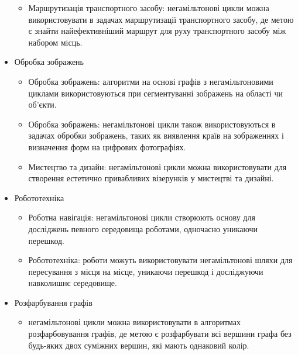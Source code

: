 \documentclass[14pt]{article}
\begin{document}
\begin{spacing}{1.175}
\begin{itemize}
\begin{itemize}
            \item Маршрутизація транспортного засобу: негамільтонові цикли можна використовувати в задачах маршрутизації транспортного засобу, де метою є знайти найефективніший маршрут для руху транспортного засобу між набором місць.
        
        \end{itemize}

            
        \item Обробка зображень
        \begin{itemize}
    
            \item Обробка зображень: алгоритми на основі графів з негамільтоновими циклами використовуються при сегментуванні зображень на області чи об’єкти.
            
            \item Обробка зображень: негамільтонові цикли також використовуються в задачах обробки зображень, таких як виявлення країв на зображеннях і визначення форм на цифрових фотографіях.

            \item Мистецтво та дизайн: негамільтонові цикли можна використовувати для створення естетично привабливих візерунків у мистецтві та дизайні.
        
        \end{itemize}
        
        \item Робототехніка
        
        \begin{itemize}
            \item Роботна навігація: негамільтонові цикли створюють основу для досліджень певного середовища роботами, одночасно уникаючи перешкод.

            \item Робототехніка: роботи можуть використовувати негамільтонові шляхи для пересування з місця на місце, уникаючи перешкод і досліджуючи навколишнє середовище.
        
        \end{itemize}


        \item Розфарбування графів
        \begin{itemize}
            
            \item негамільтонові цикли можна використовувати в алгоритмах розфарбовування графів, де метою є розфарбувати всі вершини графа без будь-яких двох суміжних вершин, які мають однаковий колір.


\end{itemize}
\end{itemize}
\end{spacing}
\end{document}
